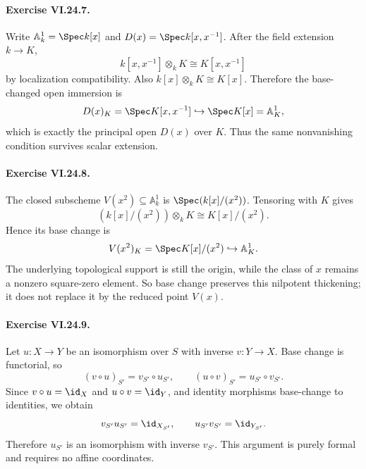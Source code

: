 \paragraph{Exercise VI.24.7.}
\begin{solution}
Write $\mathbb A^1_k=\Spec k[x]$ and $D(x)=\Spec k[x,x^{-1}]$.  After the field extension
$k\to K$,
\[
k[x,x^{-1}]\otimes_kK\cong K[x,x^{-1}]
\]
by localization compatibility.  Also $k[x]\otimes_kK\cong K[x]$.  Therefore the base-changed
open immersion is
\[
D(x)_K=\Spec K[x,x^{-1}]\hookrightarrow\Spec K[x]=\mathbb A^1_K,
\]
which is exactly the principal open $D(x)$ over $K$.  Thus the same nonvanishing condition survives
scalar extension.
\end{solution}

\paragraph{Exercise VI.24.8.}
\begin{solution}
The closed subscheme $V(x^2)\subseteq\mathbb A^1_k$ is
$\Spec(k[x]/(x^2))$.  Tensoring with $K$ gives
\[
(k[x]/(x^2))\otimes_kK\cong K[x]/(x^2).
\]
Hence its base change is
\[
V(x^2)_K=\Spec K[x]/(x^2)\hookrightarrow\mathbb A^1_K.
\]
The underlying topological support is still the origin, while the class of $x$ remains a nonzero
square-zero element.  So base change preserves this nilpotent thickening; it does not replace it by
the reduced point $V(x)$.
\end{solution}

\paragraph{Exercise VI.24.9.}
\begin{solution}
Let $u:X\to Y$ be an isomorphism over $S$ with inverse $v:Y\to X$.  Base change is functorial,
so
\[
(v\circ u)_{S'}=v_{S'}\circ u_{S'},\qquad
(u\circ v)_{S'}=u_{S'}\circ v_{S'}.
\]
Since $v\circ u=\id_X$ and $u\circ v=\id_Y$, and identity morphisms base-change to identities,
we obtain
\[
v_{S'}u_{S'}=\id_{X_{S'}},\qquad
u_{S'}v_{S'}=\id_{Y_{S'}}.
\]
Therefore $u_{S'}$ is an isomorphism with inverse $v_{S'}$.  This argument is purely formal and
requires no affine coordinates.
\end{solution}

